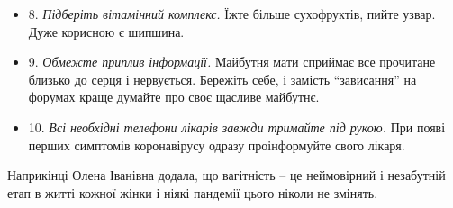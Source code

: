 \begin{itemize}
\item 8. \emph{Підберіть вітамінний комплекс.} Їжте більше сухофруктів, пийте узвар. Дуже
корисною є шипшина. 

\item 9. \emph{Обмежте приплив інформації.} Майбутня мати сприймає все прочитане близько до
серця і нервується. Бережіть себе, і замість \enquote{зависання} на форумах краще
думайте про своє щасливе майбутнє.

\item 10. \emph{Всі необхідні телефони лікарів завжди тримайте під рукою.} При появі перших
симптомів коронавірусу одразу проінформуйте свого лікаря. 
\end{itemize} %

Наприкінці Олена Іванівна додала, що вагітність – це неймовірний і незабутній
етап в житті кожної жінки і ніякі пандемії цього ніколи не змінять.
